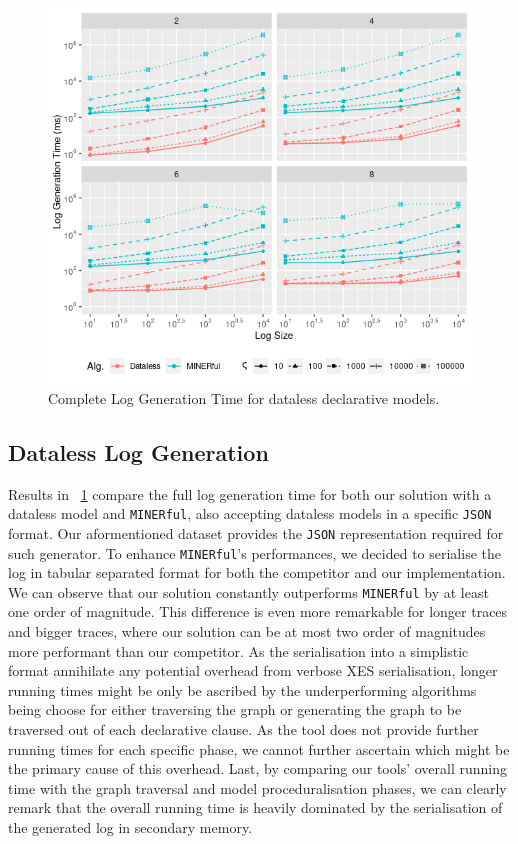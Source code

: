 \documentclass[sigconf]{acmart}
\begin{document}
\begin{figure}[!t]
\centering
\includegraphics[width=\linewidth]{fig/Minermer.png}
\caption{Complete Log Generation Time for dataless declarative models.}\label{dataless}
\end{figure}
\subsection{Dataless Log Generation}\label{ssec:dataless}
Results in \figurename~\ref{dataless} compare the full log generation time for both our solution with a dataless model and \texttt{MINERful}, also accepting dataless models in a specific \texttt{JSON} format. Our aformentioned dataset provides the \texttt{JSON} representation required for such generator. To enhance \texttt{MINERful}'s performances, we decided to serialise the log in tabular separated format for both the competitor and our implementation. We can observe that our solution constantly outperforms \texttt{MINERful} by at least one order of magnitude. This difference is even more remarkable for longer traces and bigger traces, where our solution can be at most two order of magnitudes more performant than our competitor. As the serialisation into a simplistic format annihilate any potential overhead from verbose XES serialisation, longer running times might be only be ascribed by the underperforming algorithms being choose for either traversing the graph or generating the graph to be traversed out of each declarative clause. As the tool does not provide further running times for each specific phase, we cannot further ascertain which might be the primary cause of this overhead. Last, by comparing our tools' overall running time with the graph traversal and model proceduralisation phases, we can clearly remark that the overall running time is heavily dominated by the serialisation of the generated log in secondary memory.
\end{document}
